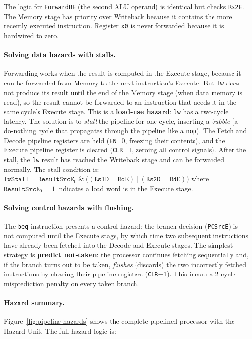 \documentclass[9pt, a4paper]{extarticle}
\begin{document}
The logic for \texttt{ForwardBE} (the second ALU operand) is identical but checks \texttt{Rs2E}. The Memory stage has priority over Writeback because it contains the more recently executed instruction. Register \texttt{x0} is never forwarded because it is hardwired to zero.

\paragraph{Solving data hazards with stalls.} Forwarding works when the result is computed in the Execute stage, because it can be forwarded from Memory to the next instruction's Execute. But \texttt{lw} does not produce its result until the end of the Memory stage (when data memory is read), so the result cannot be forwarded to an instruction that needs it in the same cycle's Execute stage. This is a \textbf{load-use hazard}: \texttt{lw} has a two-cycle latency. The solution is to \textit{stall} the pipeline for one cycle, inserting a \textit{bubble} (a do-nothing cycle that propagates through the pipeline like a \texttt{nop}). The Fetch and Decode pipeline registers are held (\texttt{EN}=0, freezing their contents), and the Execute pipeline register is cleared (\texttt{CLR}=1, zeroing all control signals). After the stall, the \texttt{lw} result has reached the Writeback stage and can be forwarded normally. The stall condition is: $\texttt{lwStall} = \texttt{ResultSrcE}_0 \;\mathbin{\&}\; \bigl((\texttt{Rs1D} = \texttt{RdE}) \mathbin{|} (\texttt{Rs2D} = \texttt{RdE})\bigr)$ where $\texttt{ResultSrcE}_0 = 1$ indicates a load word is in the Execute stage.

\paragraph{Solving control hazards with flushing.} The \texttt{beq} instruction presents a control hazard: the branch decision (\texttt{PCSrcE}) is not computed until the Execute stage, by which time two subsequent instructions have already been fetched into the Decode and Execute stages. The simplest strategy is \textbf{predict not-taken}: the processor continues fetching sequentially and, if the branch turns out to be taken, \textit{flushes} (discards) the two incorrectly fetched instructions by clearing their pipeline registers (\texttt{CLR}=1). This incurs a 2-cycle misprediction penalty on every taken branch.

\paragraph{Hazard summary.} Figure~\ref{fig:pipeline-hazards} shows the complete pipelined processor with the Hazard Unit. The full hazard logic is:
\end{document}
